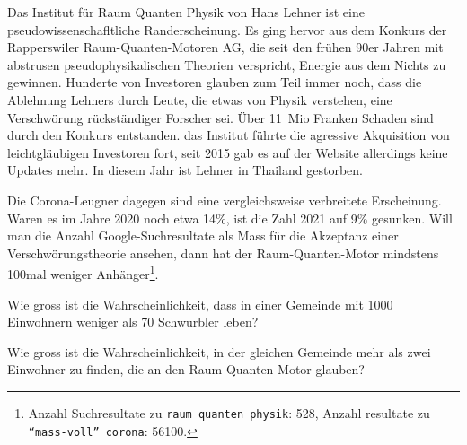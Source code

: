 Das Institut für Raum Quanten Physik von Hans Lehner ist eine
pseudowissenschafltliche Randerscheinung.
Es ging hervor aus dem Konkurs der Rapperswiler Raum-Quanten-Motoren AG,
die seit den frühen 90er Jahren mit abstrusen pseudophysikalischen
Theorien verspricht, Energie aus dem Nichts zu gewinnen.
Hunderte von Investoren glauben zum Teil immer noch,
dass die Ablehnung Lehners durch Leute, die etwas von Physik verstehen,
eine Verschwörung rückständiger Forscher sei.
Über 11~Mio Franken Schaden sind durch den Konkurs entstanden.
das Institut führte die agressive Akquisition von leichtgläubigen
Investoren fort, seit 2015 gab es auf der Website allerdings
keine Updates mehr.
In diesem Jahr ist Lehner in Thailand gestorben.

Die Corona-Leugner dagegen sind eine vergleichsweise verbreitete
Erscheinung.
Waren es im Jahre 2020 noch etwa 14\%, ist die Zahl 2021 auf 9\%
gesunken.
Will man die Anzahl Google-Suchresultate als Mass für die Akzeptanz
einer Verschwörungstheorie ansehen, dann hat der Raum-Quanten-Motor 
mindstens 100mal weniger Anhänger\footnote{Anzahl Suchresultate zu
\texttt{raum quanten physik}: 528, Anzahl resultate zu
\texttt{``mass-voll'' corona}: 56100.}.

\begin{teilaufgaben}
\item 
Wie gross ist die Wahrscheinlichkeit, dass in einer Gemeinde mit
1000 Einwohnern weniger als 70 Schwurbler leben?
\item 
Wie gross ist die Wahrscheinlichkeit, in der gleichen Gemeinde
mehr als zwei Einwohner zu finden, die an den Raum-Quanten-Motor
glauben?
\end{teilaufgaben}


